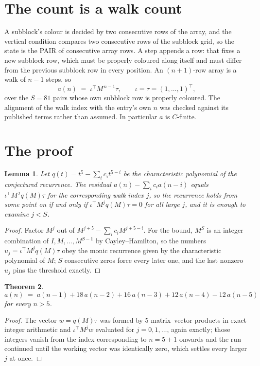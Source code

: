 \documentclass[11pt,a4paper]{article}
\theoremstyle{plain}
\newtheorem{theorem}{Theorem}
\newtheorem{lemma}[theorem]{Lemma}
\theoremstyle{definition}
\begin{document}
\section{The count is a walk count}

A subblock's colour is decided by two consecutive rows of the array, and
the vertical condition compares two consecutive rows of the subblock grid, so the state is the
PAIR of consecutive array rows. A step appends a row: that fixes a new subblock row, which
must be properly coloured along itself and must differ from the previous subblock row in every
position. An $(n+1)$-row array is a walk of $n-1$ steps, so
\[
a(n)\;=\;\iota^{\!\top}M^{\,n-1}\tau,\qquad\iota=\tau=(1,\dots,1)^{\!\top},
\]
over the $S=81$ pairs whose own subblock row is properly coloured.
The alignment of the walk index with the entry's own $n$ was checked against its published
terms rather than assumed. In particular $a$ is $C$-finite.

\section{The proof}

\begin{lemma}\label{lem:crit}
Let $q(t)=t^{5}-\sum_i c_it^{5-i}$ be the characteristic polynomial of the
conjectured recurrence. The residual $a(n)-\sum_ic_ia(n-i)$ equals
$\iota^{\!\top}M^{\,j}q(M)\tau$ for the corresponding walk index $j$, so the recurrence
holds from some point on if and only if $\iota^{\!\top}M^{j}q(M)\tau=0$ for all large $j$,
and it is enough to examine $j<S$.
\end{lemma}

\begin{proof}
Factor $M^{j}$ out of $M^{j+5}-\sum_ic_iM^{j+5-i}$. For the bound, $M^{S}$
is an integer combination of $I,M,\dots,M^{S-1}$ by Cayley--Hamilton, so the numbers
$u_j=\iota^{\!\top}M^{j}q(M)\tau$ obey the monic recurrence given by the characteristic
polynomial of $M$; $S$ consecutive zeros force every later one, and the last nonzero $u_j$
pins the threshold exactly.
\end{proof}

\begin{theorem}
\[
a(n)\;=\;a(n-1) + 18\,a(n-2) + 16\,a(n-3) + 12\,a(n-4) - 12\,a(n-5)
\]
for every $n>5$.
\end{theorem}

\begin{proof}
The vector $w=q(M)\tau$ was formed by $5$ matrix--vector products in exact integer
arithmetic and $\iota^{\!\top}M^{j}w$ evaluated for $j=0,1,\dots$, again exactly; those
integers vanish from the index corresponding to $n=5+1$ onwards and the run continued
until the working vector was identically zero, which settles every larger $j$ at once.
\end{proof}
\end{document}
